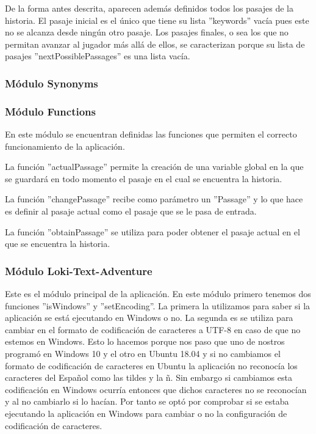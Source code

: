 \documentclass[12pt]{article}
\begin{document}
De la forma antes descrita, aparecen adem\'as definidos todos los pasajes de la historia. El pasaje inicial es el \'unico que tiene su lista ''keywords'' vac\'ia pues este no se alcanza desde ning\'un otro pasaje. Los pasajes finales, o sea los que no permitan avanzar al jugador m\'as all\'a de ellos, se caracterizan porque su lista de pasajes ''nextPossiblePassages'' es una lista vac\'ia.

\subsubsection{M\'odulo Synonyms}

\subsubsection{M\'odulo Functions}

En este m\'odulo se encuentran definidas las funciones que permiten el correcto funcionamiento de la aplicaci\'on.

La funci\'on ''actualPassage'' permite la creaci\'on de una variable global en la que se guardar\'a en todo momento el pasaje en el cual se encuentra la historia. 

La funci\'on ''changePassage'' recibe como par\'ametro un ''Passage'' y lo que hace es definir al pasaje actual como el pasaje que se le pasa de entrada.

La funci\'on ''obtainPassage'' se utiliza para poder obtener el pasaje actual en el que se encuentra la historia.

\subsubsection{M\'odulo Loki-Text-Adventure}

Este es el m\'odulo principal de la aplicaci\'on. En este m\'odulo primero tenemos dos funciones ''isWindows'' y ''setEncoding''. La primera la utilizamos para saber si la aplicaci\'on se est\'a ejecutando en Windows o no. La segunda es se utiliza para cambiar en el formato de codificaci\'on de caracteres a UTF-8 en caso de que no estemos en Windows. Esto lo hacemos porque nos paso que uno de nostros program\'o en Windows 10 y el otro en Ubuntu 18.04 y si no cambiamos el formato de codificaci\'on de caracteres en Ubuntu la aplicaci\'on no reconoc\'ia los caracteres del Español como las tildes y la ñ. Sin embargo si cambiamos esta codificaci\'on en Windows ocurr\'ia entonces que dichos caracteres no se reconoc\'ian y al no cambiarlo si lo hac\'ian. Por tanto se opt\'o por comprobar si se estaba ejecutando la aplicaci\'on en Windows para cambiar o no la configuraci\'on de codificaci\'on de caracteres.
\end{document}
